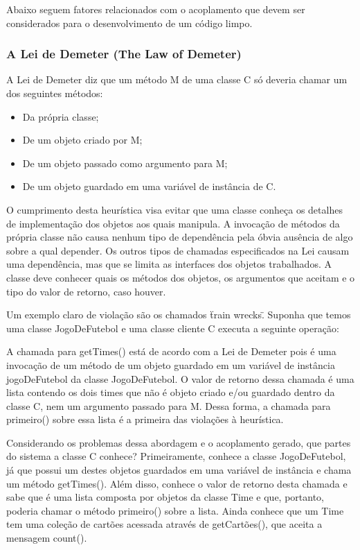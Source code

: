 Abaixo seguem fatores relacionados com o acoplamento que devem ser considerados para o desenvolvimento de um código limpo.

\subsubsection{A Lei de Demeter (The Law of Demeter)}
A Lei de Demeter diz que um método M de uma classe C só deveria chamar um dos seguintes métodos:

\begin{itemize}
	\item Da própria classe;
	\item De um objeto criado por M;
	\item De um objeto passado como argumento para M;
	\item De um objeto guardado em uma variável de instância de C.
\end{itemize}

O cumprimento desta heurística visa evitar que uma classe conheça os detalhes de implementação dos objetos aos quais manipula. A invocação de métodos da própria classe não causa nenhum tipo de dependência pela óbvia ausência de algo sobre a qual depender. Os outros tipos de chamadas especificados na Lei causam uma dependência, mas que se limita as interfaces dos objetos trabalhados. A classe deve conhecer quais os métodos dos objetos, os argumentos que aceitam e o tipo do valor de retorno, caso houver.
	
Um exemplo claro de violação são os chamados \"train wrecks\". Suponha que temos uma classe JogoDeFutebol e uma classe cliente C executa a seguinte operação:
	


A chamada para getTimes() está de acordo com a Lei de Demeter pois é uma invocação de um método de um objeto guardado em um variável de instância jogoDeFutebol da classe JogoDeFutebol. O valor de retorno dessa chamada é uma lista contendo os dois times que não é objeto criado e/ou guardado dentro da classe C, nem um argumento passado para M. Dessa forma, a chamada para primeiro() sobre essa lista é a primeira das violações à heurística.
	
Considerando os problemas dessa abordagem e o acoplamento gerado, que partes do sistema a classe C conhece? Primeiramente, conhece a classe JogoDeFutebol, já que possui um destes objetos guardados em uma variável de instância e chama um método getTimes(). Além disso, conhece o valor de retorno desta chamada e sabe que é uma lista composta por objetos da classe Time e que, portanto, poderia chamar o método primeiro() sobre a lista. Ainda conhece que um Time tem uma coleção de cartões acessada através de getCartões(), que aceita a mensagem count().
	
